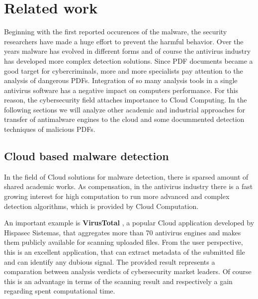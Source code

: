 \chapter{Related work}
\label{chapter:relatedWork}
Beginning with the first reported occurences of the malware, the security researchers have made a huge effort to prevent the harmful behavior. Over the years malware has evolved in different forms and of course the antivirus industry has developed more complex detection solutions. Since PDF documents became a good target for cybercriminals, more and more specialists pay attention to the analysis of dangerous PDFs. Integration of so many analysis tools in a single antivirus software has a negative impact on computers performance. For this reason, the cybersecurity field attaches importance to Cloud Computing. In the following sections we will analyze other academic and industrial approaches for transfer of antimalware engines to the cloud and some docummented detection techniques of malicious PDFs.



\section{Cloud based malware detection}
\label{section:relatedWorkCloud}

In the field of Cloud solutions for malware detection, there is sparsed amount of shared academic works. As compensation, in the antivirus industry there is a fast growing interest for high computation to run more advanced and complex detection algorithms, which is provided by Cloud Computation. \par
An important example is \textbf{VirusTotal} \cite{virustotal}, a popular Cloud application developed by Hispasec Sistemas, that aggregates more than 70 antivirus engines and makes them publicly available for scanning uploaded files. From the user perspective, this is an excellent application, that can extract metadata of the submitted file and can identify any dubious signal. The provided result represents a comparation between analysis verdicts of cybersecurity market leaders. Of course this is an advantage in terms of the scanning result and respectively a gain regarding spent computational time.

